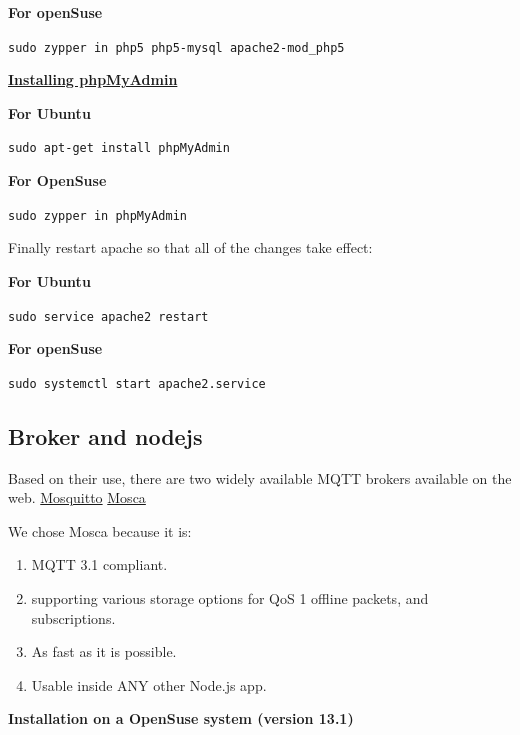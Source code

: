 \documentclass[16pt]{article}
\begin{document}
  \textbf{For openSuse}

  \texttt{sudo zypper in php5 php5-mysql apache2-mod\_php5}
  
   \vspace{0.5cm}

  {\underline{\textbf{Installing phpMyAdmin}}}

  \textbf{For Ubuntu}

  \texttt{sudo apt-get install phpMyAdmin}

  \textbf{For OpenSuse}

  \texttt{sudo zypper in phpMyAdmin}
   \vspace{0.5cm}

  Finally restart apache so that all of the changes take effect:

  \textbf{For Ubuntu}

  \texttt{sudo service apache2 restart}

  \textbf{For openSuse}

  \texttt{sudo systemctl start apache2.service}
   \vspace{0.5cm}

 

  

\subsection{Broker and nodejs}

 \vspace{0.5cm}

Based on their use, there are two widely available MQTT brokers
available on the web. 
\href{http://mosquitto.org/}{Mosquitto} 
\href{https://github.com/mcollina/mosca}{Mosca}

We chose Mosca because it is: 

\begin{enumerate}

\item MQTT 3.1 compliant.
\item supporting various storage options for QoS 1 offline packets, and subscriptions.
\item As fast as it is possible.
\item Usable inside ANY other Node.js app.

\end{enumerate}
 \vspace{0.5cm}




\textbf{Installation on a OpenSuse system (version
13.1)}
\end{document}
